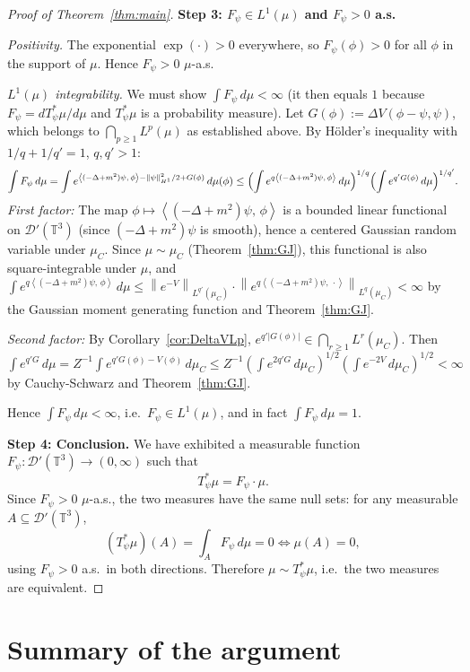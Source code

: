 \documentclass[12pt]{article}
\newcommand{\T}{\mathbb{T}}
\newcommand{\Dc}{\mathcal{D}}
\newcommand{\norm}[1]{\left\|#1\right\|}
\newcommand{\ip}[2]{\left\langle #1,\, #2 \right\rangle}
\begin{document}
\begin{proof}[Proof of Theorem~\ref{thm:main}]
\textbf{Step 3: $F_\psi\in L^1(\mu)$ and $F_\psi>0$ a.s.}

\textit{Positivity.}  The exponential $\exp(\cdot)>0$ everywhere, so $F_\psi(\phi)>0$ for
all $\phi$ in the support of $\mu$.  Hence $F_\psi>0$ $\mu$-a.s.

\textit{$L^1(\mu)$ integrability.}  We must show $\int F_\psi\,d\mu<\infty$ (it then
equals $1$ because $F_\psi = dT_\psi^*\mu/d\mu$ and $T_\psi^*\mu$ is a probability measure).
Let $G(\phi) := \Delta V(\phi-\psi,\psi)$, which belongs to $\bigcap_{p\ge 1}L^p(\mu)$
as established above.  By Hölder's inequality with $1/q+1/q'=1$, $q,q'>1$:
\[
  \int F_\psi\,d\mu
  = \int e^{\ip{(-\Delta+m^2)\psi}{\phi} - \norm\psi_{H^1}^2/2 + G(\phi)}\,d\mu(\phi)
  \le \Bigl(\int e^{q\ip{(-\Delta+m^2)\psi}{\phi}}\,d\mu\Bigr)^{1/q}
    \Bigl(\int e^{q'G(\phi)}\,d\mu\Bigr)^{1/q'}.
\]
\emph{First factor:} The map $\phi\mapsto\ip{(-\Delta+m^2)\psi}{\phi}$ is a bounded linear
functional on $\Dc'(\T^3)$ (since $(-\Delta+m^2)\psi$ is smooth), hence a centered Gaussian
random variable under $\mu_C$.  Since $\mu\sim\mu_C$ (Theorem~\ref{thm:GJ}), this functional
is also square-integrable under $\mu$, and
$\int e^{q\ip{(-\Delta+m^2)\psi}{\phi}}\,d\mu \le
  \norm{e^{-V}}_{L^{q'}(\mu_C)}\cdot\norm{e^{q\ip{(-\Delta+m^2)\psi}{\cdot}}}_{L^q(\mu_C)}<\infty$
by the Gaussian moment generating function and Theorem~\ref{thm:GJ}.

\emph{Second factor:} By Corollary~\ref{cor:DeltaVLp},
$e^{q'|G(\phi)|}\in\bigcap_{r\ge 1}L^r(\mu_C)$.  Then
$\int e^{q'G}\,d\mu = Z^{-1}\int e^{q'G(\phi)-V(\phi)}\,d\mu_C
  \le Z^{-1}(\int e^{2q'G}\,d\mu_C)^{1/2}(\int e^{-2V}\,d\mu_C)^{1/2}<\infty$
by Cauchy-Schwarz and Theorem~\ref{thm:GJ}.

Hence $\int F_\psi\,d\mu<\infty$, i.e.\ $F_\psi\in L^1(\mu)$, and in fact $\int F_\psi\,d\mu=1$.

\textbf{Step 4: Conclusion.}
We have exhibited a measurable function $F_\psi:\Dc'(\T^3)\to(0,\infty)$ such that
\[
  T_\psi^*\mu = F_\psi\cdot\mu.
\]
Since $F_\psi>0$ $\mu$-a.s., the two measures have the same null sets: for any measurable
$A\subseteq\Dc'(\T^3)$,
\[
  (T_\psi^*\mu)(A) = \int_A F_\psi\,d\mu = 0
  \iff
  \mu(A) = 0,
\]
using $F_\psi>0$ a.s.\ in both directions.  Therefore $\mu\sim T_\psi^*\mu$, i.e.\ the
two measures are equivalent.
\end{proof}

\section{Summary of the argument}
\end{document}
